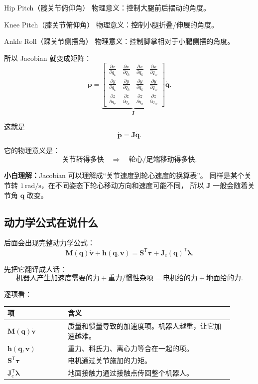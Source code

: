 \documentclass[UTF8,11pt,a4paper]{ctexart}
\newcommand{\T}{^{\mathsf T}}
\newcommand{\bs}[1]{\bm{#1}}
\begin{document}
Hip Pitch（髋关节俯仰角）
物理意义：控制大腿前后摆动的角度。

Knee Pitch（膝关节俯仰角）
物理意义：控制小腿折叠/伸展的角度。

Ankle Roll（踝关节侧摆角）
物理意义：控制脚掌相对于小腿侧摆的角度。


所以 Jacobian 就变成矩阵：
\[
\dot{\bs p}
=
\underbrace{
\begin{bmatrix}
\frac{\partial x}{\partial q_x} &
\frac{\partial x}{\partial q_h} &
\frac{\partial x}{\partial q_k} &
\frac{\partial x}{\partial q_w}\\
\frac{\partial y}{\partial q_x} &
\frac{\partial y}{\partial q_h} &
\frac{\partial y}{\partial q_k} &
\frac{\partial y}{\partial q_w}\\
\frac{\partial z}{\partial q_x} &
\frac{\partial z}{\partial q_h} &
\frac{\partial z}{\partial q_k} &
\frac{\partial z}{\partial q_w}
\end{bmatrix}
}_{\bs J}
\dot{\bs q}.
\]

这就是
\[
\dot{\bs p}=\bs J\dot{\bs q}.
\]

它的物理意义是：
\[
\text{关节转得多快}
\quad\Longrightarrow\quad
\text{轮心/足端移动得多快}.
\]

\begin{answerbox}
\textbf{小白理解：}Jacobian 可以理解成“关节速度到轮心速度的换算表”。
同样是某个关节转 \(1\,\mathrm{rad/s}\)，在不同姿态下轮心移动方向和速度可能不同，
所以 \(\bs J\) 一般会随着关节角 \(\bs q\) 改变。
\end{answerbox}

\subsection{动力学公式在说什么}

后面会出现完整动力学公式：
\[
\bs M(\bs q)\dot{\bs v}
+\bs h(\bs q,\bs v)
=
\bs S\T\bs \tau
+\bs J_c(\bs q)\T\bs \lambda.
\]

先把它翻译成人话：
\[
\text{机器人产生加速度需要的力}
+\text{重力/惯性杂项}
=
\text{电机给的力}
+\text{地面给的力}.
\]

逐项看：

\begin{center}
\begin{tabular}{p{0.24\linewidth}p{0.66\linewidth}}
\toprule
项 & 含义 \\
\midrule
\(\bs M(\bs q)\dot{\bs v}\) & 质量和惯量导致的加速度项。机器人越重，让它加速越难。\\
\(\bs h(\bs q,\bs v)\) & 重力、科氏力、离心力等合在一起的项。\\
\(\bs S\T\bs \tau\) & 电机通过关节施加的力矩。\\
\(\bs J_c\T\bs \lambda\) & 地面接触力通过接触点传回整个机器人。\\
\bottomrule
\end{tabular}
\end{center}
\end{document}
